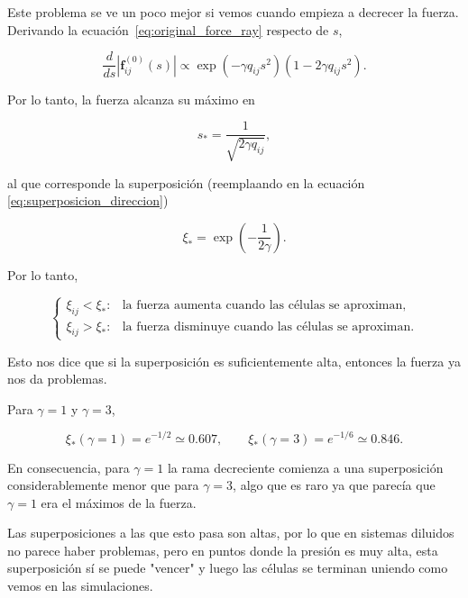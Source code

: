 \documentclass[11pt,a4paper]{article}
\begin{document}
Este problema se ve un poco mejor si vemos cuando empieza a decrecer la fuerza. Derivando la ecuación~\eqref{eq:original_force_ray} respecto de $s$,

\begin{equation}
\frac{d}{ds}
\left|\mathbf f_{ij}^{(0)}(s)\right|
\propto
\exp\left(-\gamma q_{ij}s^2\right)
\left(
1-2\gamma q_{ij}s^2
\right).
\end{equation}

Por lo tanto, la fuerza alcanza su máximo en

\begin{equation}
s_*
=
\frac{1}{\sqrt{2\gamma q_{ij}}},
\label{eq:force_peak_distance}
\end{equation}

al que corresponde la superposición (reemplaando en la ecuación \ref{eq:superposicion_direccion})

\begin{equation}
\boxed{
\xi_*
=
\exp\left(-\frac{1}{2\gamma}\right)
}.
\label{eq:force_peak_overlap}
\end{equation}

Por lo tanto,

\begin{equation}
\begin{cases}
\xi_{ij}<\xi_*:
&
\text{la fuerza aumenta cuando las células se aproximan},
\\[4pt]
\xi_{ij}>\xi_*:
&
\text{la fuerza disminuye cuando las células se aproximan}.
\end{cases}
\end{equation}

Esto nos dice que si la superposición es suficientemente alta, entonces la fuerza ya nos da problemas.

Para $\gamma=1$ y $\gamma=3$,

\begin{equation}
\xi_*(\gamma=1)
=e^{-1/2}
\simeq0.607,
\qquad
\xi_*(\gamma=3)
=e^{-1/6}
\simeq0.846.
\end{equation}

En consecuencia, para $\gamma=1$ la rama decreciente comienza a una superposición considerablemente menor que para $\gamma=3$, algo que es raro ya que parecía que $\gamma=1$ era el máximos de la fuerza. 

Las superposiciones a las que esto pasa son altas, por lo que en sistemas diluidos no parece haber problemas, pero en puntos donde la presión es muy alta, esta superposición sí se puede "vencer" y luego las células se terminan uniendo como vemos en las simulaciones.
\end{document}
